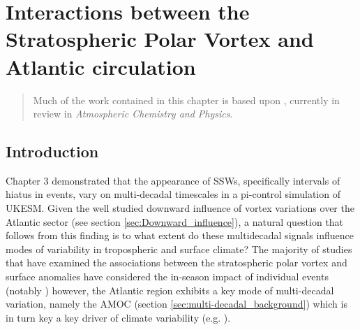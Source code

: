 \chapter{Interactions between the Stratospheric Polar Vortex and Atlantic circulation} 
\begin{quotation}
  Much of the work contained in this chapter is based upon \cite{dimdore-milesInteractions2021},
  currently in review in \emph{Atmospheric Chemistry and Physics}.
\end{quotation}

\label{cha:surface}

\section{Introduction}
Chapter 3 demonstrated that the appearance of SSWs, specifically intervals of hiatus in events, vary on multi-decadal timescales in a pi-control simulation of UKESM. Given the well studied downward influence of vortex variations over the Atlantic sector (see section \ref{sec:Downward_influence}), a natural question that follows from this finding is to what extent do these multidecadal signals influence modes of variability in tropospheric and surface climate? The majority of studies that have examined the associations between the stratospheric polar vortex and surface anomalies have considered the in-season impact of individual events (notably \cite{baldwinStratospheric2001a}) however, the Atlantic region exhibits a key mode of multi-decadal variation, namely the AMOC (section \ref{sec:multi-decadal_background}) which is in turn key a key driver of climate variability (e.g. \cite{frankignoulInfluence2013b}). 


